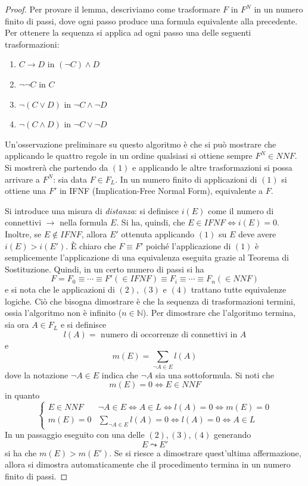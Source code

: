 \begin{proof}
Per provare il lemma, descriviamo come trasformare $F$ in $F^{N}$ in un numero 
finito di passi, dove ogni passo produce una formula equivalente alla precedente. 
Per ottenere la sequenza si applica ad ogni passo una delle seguenti 
trasformazioni: 

\begin{enumerate}
  \item $C \rightarrow D$ in $(\neg C) \land D$
  \item $\neg \neg C$ in $C$
  \item $\neg(C \lor D)$ in $\neg C \land \neg D$
  \item $\neg (C \land D)$ in $\neg C \lor \neg D$
\end{enumerate}

Un'osservazione preliminare su questo algoritmo è che si può mostrare che applicando 
le quattro regole in un ordine qualsiasi si ottiene sempre $F^{N} \in NNF$. 
Si mostrerà che partendo da $(1)$ e applicando le altre trasformazioni si possa 
arrivare a $F^{N}$: sia data $F \in F_L$. In un numero finito di applicazioni 
di $(1)$ si ottiene una $F'$ in IFNF (Implication-Free Normal Form), equivalente 
a $F$. 

Si introduce una misura di \textit{distanza}: si definisce 
$i(E)$ come il numero di connettivi $\rightarrow$ nella formula $E$. 
Si ha, quindi, 
che $E \in IFNF \iff i(E) = 0$. Inoltre, se $E \notin IFNF$, allora 
$E'$ ottenuta applicando $(1)$ su $E$ deve avere $i(E) > i(E')$. 
\`E chiaro che $F \equiv F'$ poiché l'applicazione di $(1)$ è semplicemente 
l'applicazione di una equivalenza eseguita grazie al Teorema di Sostituzione. 
Quindi, in un certo numero di passi  si ha
$$ 
F = F_0 \equiv \cdots \equiv F' (\in IFNF) \equiv F_i \equiv \cdots \equiv F_n (\in NNF)
$$
e si nota che le applicazioni di $(2)$, $(3)$ e $(4)$ trattano tutte equivalenze logiche. Ciò 
che bisogna dimostrare è che la sequenza di trasformazioni termini, ossia l'algoritmo 
non è infinito ($n \in \mathbb{N}$). 
Per dimostrare che l'algoritmo termina, sia ora $A \in F_L$ 
e si definisce 
$$ 
l(A) = \text{ numero di occorrenze di connettivi in } A
$$ 
e 
$$
m(E) = \sum_{\neg A \in E} l(A)
$$
dove la notazione $\neg A \in E$ indica che $\neg A$ sia una sottoformula.
Si noti che 
$$
m(E) = 0 \iff E \in NNF
$$
in quanto 
$$
\begin{cases}
        E \in NNF  & \neg A \in E \iff A \in L \iff l(A) = 0 \iff m(E) = 0\\
                m(E) = 0 & \sum_{\neg A \in E} l(A) = 0 \iff l(A) = 0 \iff A \in L 
\end{cases}
$$
In un passaggio eseguito con una delle $(2), (3), (4)$ generando 
$$
E \leadsto E'
$$
si ha che $m(E) > m(E')$. Se si riesce a dimostrare quest'ultima affermazione, 
allora si dimostra automaticamente che il procedimento termina in un numero 
finito di passi. 

\end{proof}
